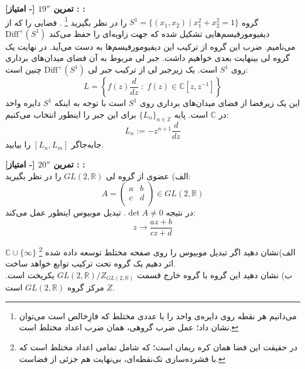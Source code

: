 \documentclass{article}
\newenvironment{parind}{%
	\par%
	\leftskip=0mm\rightskip=7mm
	\noindent\ignorespaces}{%
	\par}
\newenvironment{exercise}[3][\unskip]{%
	\par
	\noindent
	\textbf{تمرین
		#1
		[- امتیاز] 
		\def\temp{#3}\ifx\temp\empty
		: 
		\else
		: #3 \vspace{0.5em} \\ \noindent
		\fi
}}{}
\begin{document}
	\begin{exercise}[$19''$]{20}{}
		گروه 
		$S^1= \{(x_1,x_2) \; | \; x_1^2+x_2^2=1\}$ 
		را در نظر بگیرید
		\footnote{می‌دانیم هر نقطه روی دایره‌ی واحد را با عددی مختلط که فازِخالص است می‌توان نشان داد؛ عمل ضرب گروهی، همان ضرب اعداد مختلط است.}
		. فضایی را که از دیفیومورفیسم‌هایی
		تشکیل شده که جهت زاویه‌ای را حفظ می‌کند 
		$\text{Diff}^+ (S^1)$ 
		می‌نامیم. 
		ضرب این 
		گروه از ترکیب این دیفیومورفیسم‌ها به دست ‌می‌آید. در نهایت یک گروه لی بینهایت بعدی خواهیم داشت. جبر لی مربوط به آن فضای میدان‌های برداری روی 
		$S^1$ 
		است. یک زیرجبر
		لی از ترکیب جبر لی 
		$\text{Diff}^+ (S^1)$ 
		چنین است:
		\begin{equation*}
			L = \left\{ f(z) \frac{d}{dz} \; : \; f(z) \in \mathbb{C}[z,z^{-1}] \right\}
		\end{equation*}
		این یک زیرفضا از فضای میدان‌های برداری روی 
		$S^1$ 
		است با توجه به اینکه 
		$S^1$ 
		دایره واحد در 
		$\mathbb{C}$ 
		است.  پایه 
		$\{L_n\}_{n \in \mathbb{Z}}$ 
		برای این جبر را اینطور انتخاب می‌کنیم: 
		\begin{equation*}
			L_n := - z^{n+1}\frac{d}{dz}
		\end{equation*} 
		جابه‌جاگر 
		$[L_n,L_m]$ 
		را بیابید.
	\end{exercise}
	
	
	\begin{exercise}[$20''$]{20}{}
		الف)
		عضوی از گروه لی 
		$GL(2,\mathbb{R})$ 
		را در نظر بگیرید: 
		\begin{equation*}
			A=\left(
			\begin{matrix}a&b\\c&d\\\end{matrix}
			\right) \in GL(2,\mathbb{R})
		\end{equation*}
		در نتیجه 
		$\det A \neq 0$. 
		تبدیل موبیوس
		اینطور عمل می‌کند:
		\begin{equation*}
			z \to \frac{az+b}{cz+d}
		\end{equation*}
		\begin{parind}
			الف)نشان دهید اگر تبدیل موبیوس را روی صفحه مختلط توسعه داده شده
			\footnote{در حقیقت این فضا همان کره ریمان است؛ که شامل تمامی اعداد مختلط است که با فشرده‌سازی تک‌نقطه‌ای، بی‌نهایت هم جزئی از فضاست.} 
			$\mathbb{C}\cup \{ \infty \}$ 
			اثر دهیم یک گروه تحت ترکیب توابع خواهد ساخت. 
			\\
			ب) نشان دهید این گروه با گروه خارج قسمت 
			$GL(2,\mathbb{R}) / Z_{GL(2,\mathbb{R})}$ 
			یکریخت است. 
			$Z$
			مرکز گروه 
			$GL(2,\mathbb{R})$ 
			است.
		\end{parind}
		
		
	\end{exercise}
	
\end{document}
